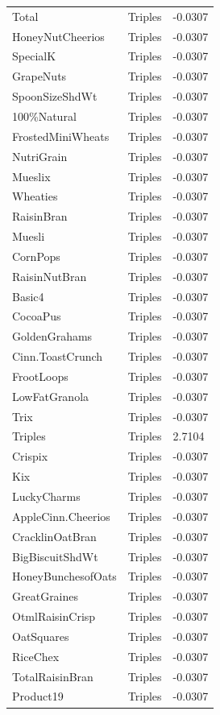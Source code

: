 \begin{table}[!htbp]
\begin{tabular}{lll}
\\
Total & Triples & -0.0307
\\
HoneyNutCheerios & Triples & -0.0307
\\
SpecialK & Triples & -0.0307
\\
GrapeNuts & Triples & -0.0307
\\
SpoonSizeShdWt & Triples & -0.0307
\\
100\%Natural & Triples & -0.0307
\\
FrostedMiniWheats & Triples & -0.0307
\\
NutriGrain & Triples & -0.0307
\\
Mueslix & Triples & -0.0307
\\
Wheaties & Triples & -0.0307
\\
RaisinBran & Triples & -0.0307
\\
Muesli & Triples & -0.0307
\\
CornPops & Triples & -0.0307
\\
RaisinNutBran & Triples & -0.0307
\\
Basic4 & Triples & -0.0307
\\
CocoaPus & Triples & -0.0307
\\
GoldenGrahams & Triples & -0.0307
\\
Cinn.ToastCrunch & Triples & -0.0307
\\
FrootLoops & Triples & -0.0307
\\
LowFatGranola & Triples & -0.0307
\\
Trix & Triples & -0.0307
\\
Triples & Triples & 2.7104
\\
Crispix & Triples & -0.0307
\\
Kix & Triples & -0.0307
\\
LuckyCharms & Triples & -0.0307
\\
AppleCinn.Cheerios & Triples & -0.0307
\\
CracklinOatBran & Triples & -0.0307
\\
BigBiscuitShdWt & Triples & -0.0307
\\
HoneyBunchesofOats & Triples & -0.0307
\\
GreatGraines & Triples & -0.0307
\\
OtmlRaisinCrisp & Triples & -0.0307
\\
OatSquares & Triples & -0.0307
\\
RiceChex & Triples & -0.0307
\\
TotalRaisinBran & Triples & -0.0307
\\
Product19 & Triples & -0.0307

\end{tabular}
\end{table}
